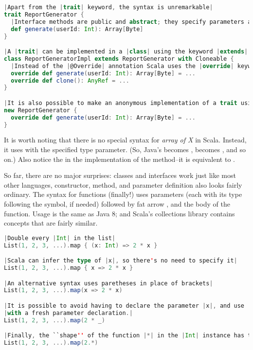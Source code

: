 \documentclass[10 pt]{article}
\begin{document}
\begin{lstlisting}[caption={Traits}, label={code:syntax-trait}, language=Scala, escapechar=|]
|Apart from the |trait| keyword, the syntax is unremarkable|
trait ReportGenerator {
  |Interface methods are public and abstract; they specify parameters and return type|
  def generate(userId: Int): Array[Byte]
}

|A |trait| can be implemented in a |class| using the keyword |extends|. Additional traits to be implemented use the |with| keyword.|
class ReportGeneratorImpl extends ReportGenerator with Cloneable {
  |Instead of the |@Override| annotation Scala uses the |override| keyword.|
  override def generate(userId: Int): Array[Byte] = ...
  override def clone(): AnyRef = ...
}

|It is also possible to make an anonymous implementation of a trait using the |new| keyword.|
new ReportGenerator {
  override def generate(userId: Int): Array[Byte] = ...
}
\end{lstlisting}

It is worth noting that there is no special syntax for \emph{array of X} in Scala. Instead, it uses  with the specified type parameter. (So, Java's  becomes ,  becomes , and so on.) Also notice the  in the implementation of the  method--it is equivalent to .

So far, there are no major surprises: classes and interfaces work just like most other languages, constructor, method, and parameter definition also looks fairly ordinary. The syntax for functions (finally!) uses parameters (each with its type following the \pcode{:} symbol, if needed) followed by fat arrow \pcode{=>}, and the body of the function. Usage is the same as Java 8; and Scala's collections library contains concepts that are fairly similar.

\begin{lstlisting}[caption={Fields \& variables}, label={code:syntax-fun}, language=Scala, escapechar=|]
|Double every |Int| in the list|
List(1, 2, 3, ...).map { (x: Int) => 2 * x }

|Scala can infer the type of |x|, so there's no need to specify it|
List(1, 2, 3, ...).map { x => 2 * x }

|An alternative syntax uses paretheses in place of brackets|
List(1, 2, 3, ...).map(x => 2 * x)

|It is possible to avoid having to declare the parameter |x|, and use |_| instead. Scala compiler replaces the every occurrence of |_
|with a fresh parameter declaration.|
List(1, 2, 3, ...).map(2 * _)

|Finally, the ``shape'' of the function |*| in the |Int| instance has the right type, so it can be used directly.|
List(1, 2, 3, ...).map(2.*)
\end{lstlisting}
\end{document}

